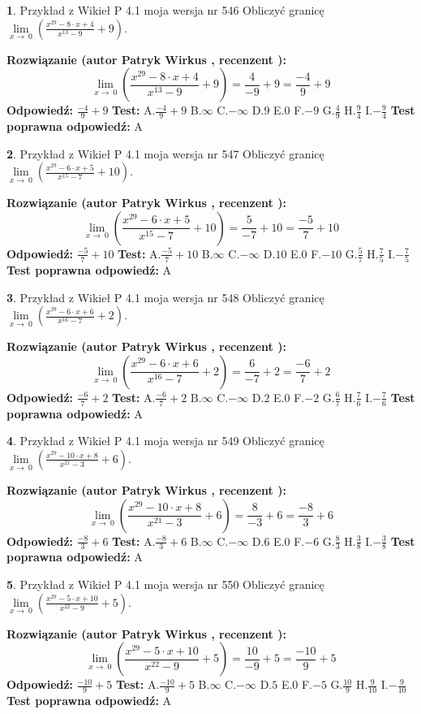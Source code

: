 \documentclass[12pt, a4paper]{article}
\theoremstyle{definition} %
\newtheorem{zad}{}
\newcommand{\zadStart}[1]{\begin{zad}#1\newline}
\newcommand{\zadStop}{\end{zad}}
\newcommand{\rozwStart}[2]{\noindent \textbf{Rozwiązanie (autor #1 , recenzent #2): }\newline}
\newcommand{\rozwStop}{\newline}
\newcommand{\odpStart}{\noindent \textbf{Odpowiedź:}\newline}
\newcommand{\odpStop}{\newline}
\newcommand{\testStart}{\noindent \textbf{Test:}\newline}
\newcommand{\testStop}{\newline}
\newcommand{\kluczStart}{\noindent \textbf{Test poprawna odpowiedź:}\newline}
\newcommand{\kluczStop}{\newline}
\begin{document}
\zadStart{Przykład z Wikieł P 4.1 moja wersja nr 546}
Obliczyć granicę $\lim\limits_{x\to\ 0}(\frac{x^{29}-8 \cdot x +4}{x^{13}-9}+9)$.
\zadStop
\rozwStart{Patryk Wirkus}{}
$$\lim\limits_{x\to\ 0}(\frac{x^{29}-8 \cdot x +4}{x^{13}-9}+9)=\frac{4}{-9}+9=\frac{-4}{9}+9$$
\rozwStop
\odpStart
$\frac{-4}{9}+9$
\odpStop
\testStart
A.$\frac{-4}{9}+9$
B.$\infty$
C.$-\infty$
D.$9$
E.$0$
F.$-9$
G.$\frac{4}{9}$
H.$\frac{9}{4}$
I.$-\frac{9}{4}$
\testStop
\kluczStart
A
\kluczStop



\zadStart{Przykład z Wikieł P 4.1 moja wersja nr 547}
Obliczyć granicę $\lim\limits_{x\to\ 0}(\frac{x^{29}-6 \cdot x +5}{x^{15}-7}+10)$.
\zadStop
\rozwStart{Patryk Wirkus}{}
$$\lim\limits_{x\to\ 0}(\frac{x^{29}-6 \cdot x +5}{x^{15}-7}+10)=\frac{5}{-7}+10=\frac{-5}{7}+10$$
\rozwStop
\odpStart
$\frac{-5}{7}+10$
\odpStop
\testStart
A.$\frac{-5}{7}+10$
B.$\infty$
C.$-\infty$
D.$10$
E.$0$
F.$-10$
G.$\frac{5}{7}$
H.$\frac{7}{5}$
I.$-\frac{7}{5}$
\testStop
\kluczStart
A
\kluczStop



\zadStart{Przykład z Wikieł P 4.1 moja wersja nr 548}
Obliczyć granicę $\lim\limits_{x\to\ 0}(\frac{x^{29}-6 \cdot x +6}{x^{16}-7}+2)$.
\zadStop
\rozwStart{Patryk Wirkus}{}
$$\lim\limits_{x\to\ 0}(\frac{x^{29}-6 \cdot x +6}{x^{16}-7}+2)=\frac{6}{-7}+2=\frac{-6}{7}+2$$
\rozwStop
\odpStart
$\frac{-6}{7}+2$
\odpStop
\testStart
A.$\frac{-6}{7}+2$
B.$\infty$
C.$-\infty$
D.$2$
E.$0$
F.$-2$
G.$\frac{6}{7}$
H.$\frac{7}{6}$
I.$-\frac{7}{6}$
\testStop
\kluczStart
A
\kluczStop



\zadStart{Przykład z Wikieł P 4.1 moja wersja nr 549}
Obliczyć granicę $\lim\limits_{x\to\ 0}(\frac{x^{29}-10 \cdot x +8}{x^{21}-3}+6)$.
\zadStop
\rozwStart{Patryk Wirkus}{}
$$\lim\limits_{x\to\ 0}(\frac{x^{29}-10 \cdot x +8}{x^{21}-3}+6)=\frac{8}{-3}+6=\frac{-8}{3}+6$$
\rozwStop
\odpStart
$\frac{-8}{3}+6$
\odpStop
\testStart
A.$\frac{-8}{3}+6$
B.$\infty$
C.$-\infty$
D.$6$
E.$0$
F.$-6$
G.$\frac{8}{3}$
H.$\frac{3}{8}$
I.$-\frac{3}{8}$
\testStop
\kluczStart
A
\kluczStop



\zadStart{Przykład z Wikieł P 4.1 moja wersja nr 550}
Obliczyć granicę $\lim\limits_{x\to\ 0}(\frac{x^{29}-5 \cdot x +10}{x^{22}-9}+5)$.
\zadStop
\rozwStart{Patryk Wirkus}{}
$$\lim\limits_{x\to\ 0}(\frac{x^{29}-5 \cdot x +10}{x^{22}-9}+5)=\frac{10}{-9}+5=\frac{-10}{9}+5$$
\rozwStop
\odpStart
$\frac{-10}{9}+5$
\odpStop
\testStart
A.$\frac{-10}{9}+5$
B.$\infty$
C.$-\infty$
D.$5$
E.$0$
F.$-5$
G.$\frac{10}{9}$
H.$\frac{9}{10}$
I.$-\frac{9}{10}$
\testStop
\kluczStart
A
\kluczStop
\end{document}
